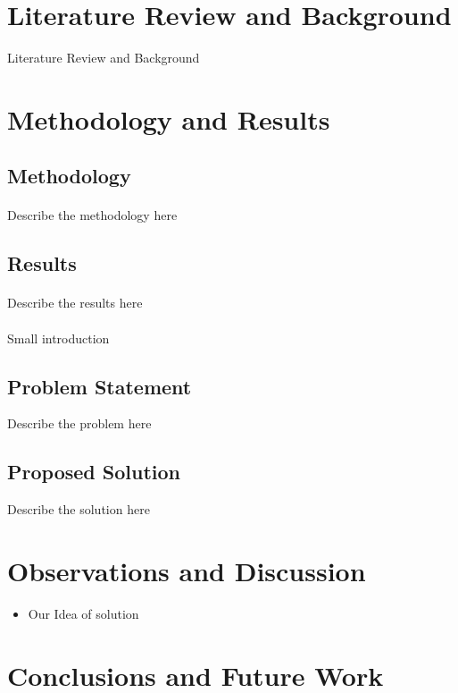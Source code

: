 \documentclass[journal]{IEEEtran}
\begin{document}
\section{Literature Review and Background}
Literature Review and Background
\section{Methodology and Results}
\subsection{Methodology}
\paragraph{} Describe the methodology here
\subsection{Results}
\paragraph{} Describe the results here
\paragraph{} Small introduction

\subsection{Problem Statement}
  Describe the problem here
\subsection{Proposed Solution}
  Describe the solution here
\section{Observations and Discussion}
\begin{itemize}
  \item Our Idea of solution
  
\end{itemize}
\section{Conclusions and Future Work }
\end{document}
